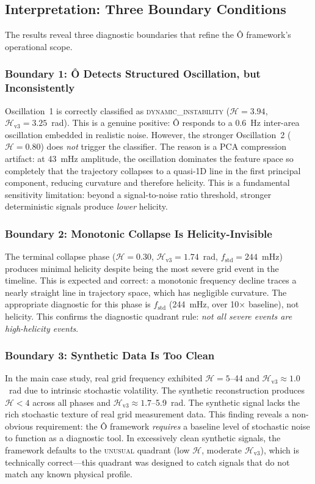\documentclass[11pt,a4paper]{article}
\begin{document}
\subsection{Interpretation: Three Boundary Conditions}

The results reveal three diagnostic boundaries that refine the Ô framework's operational scope.

\subsubsection{Boundary 1: Ô Detects Structured Oscillation, but Inconsistently}

Oscillation~1 is correctly classified as \textsc{dynamic\_instability} ($\mathcal{H}=3.94$, $\mathcal{H}_{\text{v3}}=3.25$~rad). This is a genuine positive: Ô responds to a 0.6~Hz inter-area oscillation embedded in realistic noise. However, the stronger Oscillation~2 ($\mathcal{H}=0.80$) does \emph{not} trigger the classifier. The reason is a PCA compression artifact: at 43~mHz amplitude, the oscillation dominates the feature space so completely that the trajectory collapses to a quasi-1D line in the first principal component, reducing curvature and therefore helicity. This is a fundamental sensitivity limitation: beyond a signal-to-noise ratio threshold, stronger deterministic signals produce \emph{lower} helicity.

\subsubsection{Boundary 2: Monotonic Collapse Is Helicity-Invisible}

The terminal collapse phase ($\mathcal{H}=0.30$, $\mathcal{H}_{\text{v3}}=1.74$~rad, $f_{\text{std}}=244$~mHz) produces minimal helicity despite being the most severe grid event in the timeline. This is expected and correct: a monotonic frequency decline traces a nearly straight line in trajectory space, which has negligible curvature. The appropriate diagnostic for this phase is $f_{\text{std}}$ (244~mHz, over 10$\times$ baseline), not helicity. This confirms the diagnostic quadrant rule: \emph{not all severe events are high-helicity events}.

\subsubsection{Boundary 3: Synthetic Data Is Too Clean}

In the main case study, real grid frequency exhibited $\mathcal{H} = 5$--44 and $\mathcal{H}_{\text{v3}} \approx 1.0$~rad due to intrinsic stochastic volatility. The synthetic reconstruction produces $\mathcal{H} < 4$ across all phases and $\mathcal{H}_{\text{v3}} \approx 1.7$--5.9~rad. The synthetic signal lacks the rich stochastic texture of real grid measurement data. This finding reveals a non-obvious requirement: the Ô framework \emph{requires} a baseline level of stochastic noise to function as a diagnostic tool. In excessively clean synthetic signals, the framework defaults to the \textsc{unusual} quadrant (low $\mathcal{H}$, moderate $\mathcal{H}_{\text{v3}}$), which is technically correct—this quadrant was designed to catch signals that do not match any known physical profile.
\end{document}
